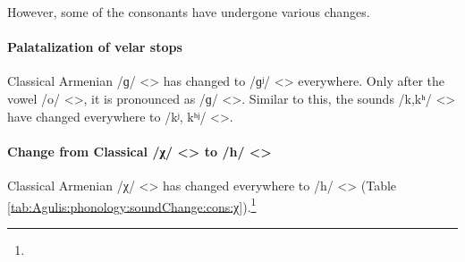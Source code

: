 \begin{table}[H]
	\centering
	\caption{Change from Classical Armenian /ov/ <> to /ɑv/ <> in the Agulis dialect}
	\label{tab:Agulis:phonology:soundChange:cons:voice} 
\end{table}


However, some of the consonants have undergone various changes. 

\paragraph{Palatalization of velar stops}

Classical Armenian /ɡ/ <> has changed to /ɡʲ/ <> everywhere. Only after the vowel /o/ <>, it is pronounced as /ɡ/ <>. Similar to this, the sounds /k,kʰ/ <> have changed everywhere to /kʲ, kʰʲ/ <>. 

\paragraph{Change from Classical /χ/ <> to /h/ <>}

Classical Armenian /χ/ <> has changed everywhere to /h/ <> (Table \ref{tab:Agulis:phonology:soundChange:cons:χ}).\footnote{} 


